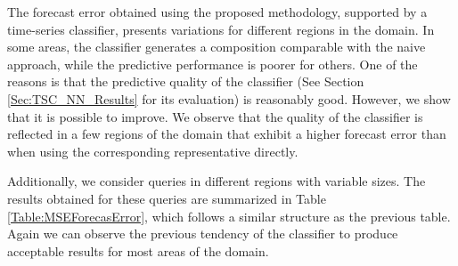 The forecast error obtained using the proposed methodology, supported by a time-series classifier, presents variations for different regions in the domain. In some areas, the classifier generates a composition comparable with the naive approach, while the predictive performance is poorer for others. One of the reasons is that the predictive quality of the classifier (See Section \ref{Sec:TSC_NN_Results} for its evaluation) is reasonably good. However, we show that it is possible to improve. We observe that the quality of the classifier is reflected in a few regions of the domain that exhibit a higher forecast error than when using the corresponding representative directly.

Additionally, we consider queries in different regions with variable sizes. The results obtained for these queries are summarized in Table \ref{Table:MSEForecasError}, which follows a similar structure as the previous table. Again we can observe the previous tendency of the classifier to produce acceptable results for most areas of the domain.

